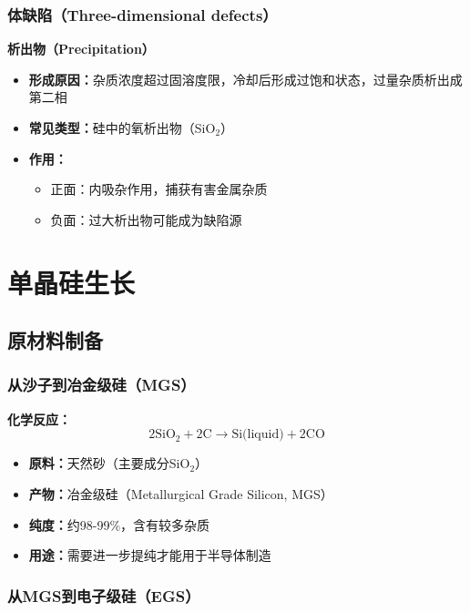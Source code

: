 \documentclass[UTF8,12pt,a4paper]{ctexart}
\begin{document}
\subsubsection{体缺陷（Three-dimensional defects）}

\textbf{析出物（Precipitation）}

\begin{itemize}
    \item \textbf{形成原因：}杂质浓度超过固溶度限，冷却后形成过饱和状态，过量杂质析出成第二相
    \item \textbf{常见类型：}硅中的氧析出物（SiO$_2$）
    \item \textbf{作用：}
    \begin{itemize}
        \item 正面：内吸杂作用，捕获有害金属杂质
        \item 负面：过大析出物可能成为缺陷源
    \end{itemize}
\end{itemize}

\section{单晶硅生长}

\subsection{原材料制备}

\subsubsection{从沙子到冶金级硅（MGS）}

\textbf{化学反应：}
\begin{equation}
2\text{SiO}_2 + 2\text{C} \rightarrow \text{Si(liquid)} + 2\text{CO}
\end{equation}

\begin{itemize}
    \item \textbf{原料：}天然砂（主要成分SiO$_2$）
    \item \textbf{产物：}冶金级硅（Metallurgical Grade Silicon, MGS）
    \item \textbf{纯度：}约98-99\%，含有较多杂质
    \item \textbf{用途：}需要进一步提纯才能用于半导体制造
\end{itemize}

\subsubsection{从MGS到电子级硅（EGS）}
\end{document}
